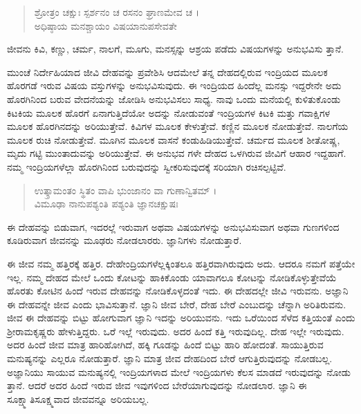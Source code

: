 \begin{verse}
ಶ್ರೋತ್ರಂ ಚಕ್ಷುಃ ಸ್ಪರ್ಶನಂ ಚ ರಸನಂ ಘ್ರಾಣಮೇವ ಚ ।\\ಅಧಿಷ್ಠಾಯ ಮನಶ್ಚಾಯಂ ವಿಷಯಾನುಪಸೇವತೇ 
\end{verse}

{\small ಜೀವನು ಕಿವಿ, ಕಣ್ಣು, ಚರ್ಮ, ನಾಲಗೆ, ಮೂಗು, ಮನಸ್ಸನ್ನು ಆಶ್ರಯ ಪಡೆದು ವಿಷಯಗಳನ್ನು ಅನುಭವಿಸು ತ್ತಾನೆ.}

ಮುಂಚೆ ನಿರ್ದೇಹಿಯಾದ ಜೀವಿ ದೇಹವನ್ನು ಪ್ರವೇಶಿಸಿ ಆದಮೇಲೆ ತನ್ನ ದೇಹದಲ್ಲಿರುವ ಇಂದ್ರಿಯದ ಮೂಲಕ ಹೊರಗಡೆ ಇರುವ ವಿಷಯ ವಸ್ತುಗಳನ್ನು ಅನುಭವಿಸುವುದು. ಈ ಇಂದ್ರಿಯದ ಹಿಂದೆಲ್ಲ ಮನಸ್ಸು ಇದ್ದರೇನೇ ಅದು ಹೊರಗಿನಿಂದ ಬರುವ ವೇದನೆಯನ್ನು ಜೋಡಿಸಿ ಅನುಭವಿಸಲು ಸಾಧ್ಯ. ನಾವು ಒಂದು ಮನೆಯಲ್ಲಿ ಕುಳಿತುಕೊಂಡು ಕಿಟಕಿಯ ಮೂಲಕ ಹೊರಗೆ ಏನಾಗುತ್ತಿದೆಯೋ ಅದನ್ನು ನೋಡುವಂತೆ ಇಂದ್ರಿಯಗಳ ಕಿಟಕಿ ಮತ್ತು ಗವಾಕ್ಷಿಗಳ ಮೂಲಕ ಹೊರಗಿನದನ್ನು ಅರಿಯುತ್ತೇವೆ. ಕಿವಿಗಳ ಮೂಲಕ ಕೇಳುತ್ತೇವೆ. ಕಣ್ಣಿನ ಮೂಲಕ ನೋಡುತ್ತೇವೆ. ನಾಲಗೆಯ ಮೂಲಕ ರುಚಿ ನೋಡುತ್ತೇವೆ. ಮೂಗಿನ ಮೂಲಕ ವಾಸನೆ ಕಂಡುಹಿಡಿಯುತ್ತೇವೆ. ಚರ್ಮದ ಮೂಲಕ ಶೀತೋಷ್ಣ, ಮೃದು ಗಟ್ಟಿ ಮುಂತಾದುವನ್ನು ಅರಿಯುತ್ತೇವೆ. ಈ ಅನುಭವ ಗಳೇ ದೇಹದ ಒಳಗಿರುವ ಜೀವಿಗೆ ಆಹಾರ ಇದ್ದಹಾಗೆ. ನಮ್ಮ ಇಂದ್ರಿಯಗಳೆಲ್ಲಾ ಹೊರಗಿನಿಂದ ಬರುವುದನ್ನು ಸ್ವೀಕರಿಸುವುದಕ್ಕೆ ಸರಿಯಾಗಿ ರಚಿಸಲ್ಪಟ್ಟಿವೆ.

\begin{verse}
ಉತ್ಕ್ರಾಮಂತಂ ಸ್ಥಿತಂ ವಾಪಿ ಭುಂಜಾನಂ ವಾ ಗುಣಾನ್ವಿತಮ್ ।\\ವಿಮೂಢಾ ನಾನುಪಶ್ಯಂತಿ ಪಶ್ಯಂತಿ ಜ್ಞಾನಚಕ್ಷುಷಃ 
\end{verse}

{\small ಈ ದೇಹವನ್ನು ಬಿಡುವಾಗ, ಇದರಲ್ಲೆ ಇರುವಾಗ ಅಥವಾ ವಿಷಯಗಳನ್ನು ಅನುಭವಿಸುವಾಗ ಅಥವಾ ಗುಣಗಳಿಂದ ಕೂಡಿರುವಾಗ ಜೀವನನ್ನು ಮೂಢರು ನೋಡಲಾರರು. ಜ್ಞಾನಿಗಳು ನೋಡುತ್ತಾರೆ.}

ಈ ಜೀವ ನಮ್ಮ ಹತ್ತಿರಕ್ಕೆ ಹತ್ತಿರ. ದೇಹೇಂದ್ರಿಯಗಳೆಲ್ಲಕ್ಕಿಂತಲೂ ಹತ್ತಿರವಾಗಿರುವುದು ಅದು. ಆದರೂ ನಮಗೆ ಪತ್ತೆಯೇ ಇಲ್ಲ. ನಮ್ಮ ದೇಹದ ಮೇಲೆ ಒಂದು ಕೋಟನ್ನು ಹಾಕಿಕೊಂಡು ಯಾವಾಗಲೂ ಕೋಟನ್ನು ನೋಡಿಕೊಳ್ಳುತ್ತೇವೆಯೆ ಹೊರತು ಕೋಟಿನ ಹಿಂದೆ ಇರುವ ದೇಹವನ್ನು ನೋಡಿಕೊಳ್ಳದಂತೆ ಇದು. ಈ ದೇಹದಲ್ಲೇ ಜೀವಿ ಇರುವನು. ಅಜ್ಞಾನಿ ಈ ದೇಹವನ್ನೇ ಜೀವ ಎಂದು ಭಾವಿಸುತ್ತಾನೆ. ಜ್ಞಾನಿ ಜೀವ ಬೇರೆ, ದೇಹ ಬೇರೆ ಎಂಬುದನ್ನು ಚೆನ್ನಾಗಿ ಅರಿತಿರುವನು. ಜೀವ ಈ ದೇಹವನ್ನು ಬಿಟ್ಟು ಹೋಗುವಾಗ ಜ್ಞಾನಿ ಇದನ್ನು ಅರಿಯುವನು. ಇದು ಒರೆಯಿಂದ ಸೆಳೆದ ಕತ್ತಿಯಂತೆ ಎಂದು ಶ್ರೀರಾಮಕೃಷ್ಣರು ಹೇಳುತ್ತಿದ್ದರು. ಒರೆ ಇಲ್ಲೆ ಇರುವುದು. ಅದರ ಹಿಂದೆ ಕತ್ತಿ ಇರುವುದಿಲ್ಲ. ದೇಹ ಇಲ್ಲೇ ಇರುವುದು. ಅದರ ಹಿಂದೆ ಜೀವ ಮಾತ್ರ ಹಾರಿಹೋಗಿದೆ, ಹಕ್ಕಿ ಗೂಡನ್ನು ಹಿಂದೆ ಬಿಟ್ಟು ಹಾರಿ ಹೋದಂತೆ. ಸಾಯುತ್ತಿರುವ ಮನುಷ್ಯನನ್ನು ಎಲ್ಲರೂ ನೋಡುತ್ತಾರೆ. ಜ್ಞಾನಿ ಮಾತ್ರ ಜೀವ ದೇಹದಿಂದ ಬೇರೆ ಆಗುತ್ತಿರುವುದನ್ನು ನೋಡಬಲ್ಲ. ಅಜ್ಞಾನಿಯು ಸಾಯುವ ಮನುಷ್ಯನಲ್ಲಿ ಇಂದ್ರಿಯಗಳಾದ ಮೇಲೆ ಇಂದ್ರಿಯಗಳು ಕೆಲಸ ಮಾಡದೆ ಇರುವುದನ್ನು ನೋಡು ತ್ತಾನೆ. ಆದರೆ ಅದರ ಹಿಂದೆ ಇರುವ ಜೀವ ಇವುಗಳಿಂದ ಬೇರೆಯಾಗುವುದನ್ನು ನೋಡಲಾರ. ಜ್ಞಾನಿ ಈ ಸೂಕ್ಷ್ಮಾತಿಸೂಕ್ಷ್ಮವಾದ ಜೀವವನ್ನೂ ಅರಿಯಬಲ್ಲ.

